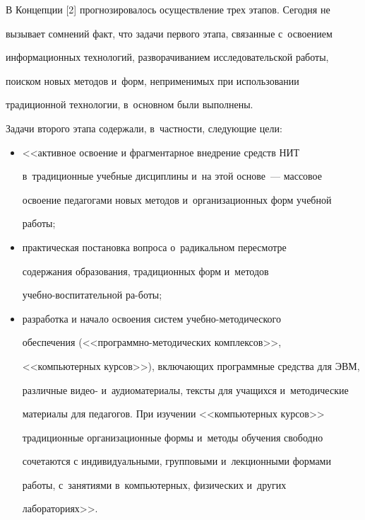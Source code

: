  В Концепции [2] прогнозировалось осуществление трех этапов. Сегодня не


вызывает сомнений факт, что задачи первого этапа, связанные с~освоением


информационных технологий, разворачиванием исследовательской работы,


поиском новых методов и~форм, неприменимых при использовании


традиционной технологии, в~основном были выполнены.





 Задачи второго этапа содержали, в~частности, следующие цели:


 \begin{itemize}


\item <<активное освоение и фрагментарное внедрение средств НИТ


в~традиционные учебные дисциплины и~на этой основе~--- массовое


освоение педагогами новых методов и~организационных форм учебной


работы;


\item практическая постановка вопроса о~радикальном пересмотре


содержания образования, традиционных форм и~методов


учеб\-но-вос\-пи\-та\-тель\-ной ра-\linebreak боты;


\item разработка и начало освоения систем учеб\-но-ме\-то\-ди\-че\-ско\-го


обеспечения (<<про\-грам\-мно-ме\-то\-ди\-че\-ских комплексов>>,


<<компьютерных курсов>>), включающих программные средства для ЭВМ,


различные видео- и~аудиоматериалы, тексты для учащихся и~методические


материалы для педагогов. При изучении <<компьютерных курсов>>


традиционные организационные формы и~методы обучения свободно


сочетаются с индивидуальными, групповыми и~лекционными формами


работы, с~занятиями в~компьютерных, физических и~других


лабораториях>>.


\end{itemize}





